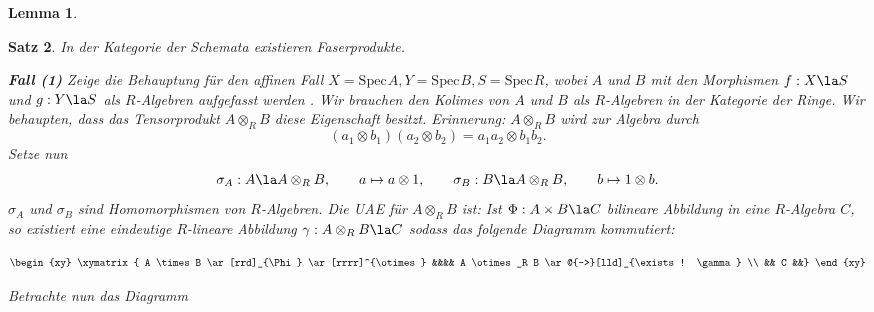\documentclass[11pt]{book}
\newtheorem{theorem}{Satz}[section]
\newtheorem{lemma}[theorem]{Lemma}
\theoremstyle{nonumberbreak}
\newenvironment{pr}[1][]{\ifthenelse{\equal{#1}{}}{\proof}{\proof[#1]}\rm}{\endproof}
\newcommand{\spec}{\mathrm{Spec} \hspace{1pt} }
\begin{document}
\begin{spacing}{1.4}
\begin{lemma}
\begin{pr}
\end{pr}
\end{lemma}

\begin{theorem} %
In der Kategorie der Schemata existieren Faserprodukte.
\begin{pr}
\begin{compactenum}
\item[\textbf{Fall (1)}] Zeige die Behauptung für den affinen Fall $X= \spec A, Y = \spec B, S = \spec R$, wobei $A$ und $B$ mit den Morphismen $f: X\la S$ und $g: Y \la S$ als $R$-Algebren aufgefasst werden . Wir brauchen den Kolimes von $A$ und $B$ als $R$-Algebren in der Kategorie der Ringe. Wir behaupten, dass das Tensorprodukt $A \otimes_R B$ diese Eigenschaft besitzt. Erinnerung: $A \otimes_R B$ wird zur Algebra durch 
$$(a_1 \otimes b_1)(a_2 \otimes b_2) = a_1a_2 \otimes b_1 b_2.$$
Setze nun 
$$\sigma_A: A \la A \otimes_R B, \qquad a \mapsto a \otimes 1, \qquad \sigma_B: B \la A \otimes_R B, \qquad b \mapsto 1 \otimes b.$$
$\sigma_A$ und $\sigma_B$ sind Homomorphismen von $R$-Algebren. Die UAE für $A \otimes_R B$ ist: Ist $\Phi: A \times B \la C$ bilineare Abbildung in eine $R$-Algebra $C$, so existiert eine eindeutige $R$-lineare Abbildung $\gamma: A \otimes_R B \la C$ sodass das folgende Diagramm kommutiert:

$$
\begin{xy}
\xymatrix{
A \times B \ar[rrd]_{\Phi} \ar[rrrr]^{\otimes} &&&& A \otimes_R B \ar@{-->}[lld]_{\exists ! \gamma} \\
&& C &&}
\end{xy}
$$

Betrachte nun das Diagramm


\end{compactenum}
\end{pr}
\end{theorem}
\end{spacing}
\end{document}
